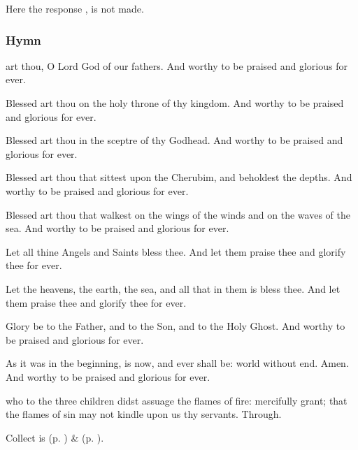 \begin{rubric}
    Here the response , is not made.
\end{rubric}

\subsubsection{Hymn}
 art thou, O Lord God of our fathers. And worthy to be praised and glorious for ever.\par
{}

Blessed art thou on the holy throne of thy kingdom. And worthy to be praised and glorious for ever.

Blessed art thou in the sceptre of thy Godhead. And worthy to be praised and glorious for ever.

Blessed art thou that sittest upon the Cherubim, and beholdest the depths. And worthy to be praised and glorious for ever.

Blessed art thou that walkest on the wings of the winds and on the waves of the sea. And worthy to be praised and glorious for ever.

Let all thine Angels and Saints bless thee. And let them praise thee and glorify thee for ever.

Let the heavens, the earth, the sea, and all that in them is bless thee. And let them praise thee and glorify thee for ever.

Glory be to the Father, and to the Son, and to the Holy Ghost. And worthy to be praised and glorious for ever.

As it was in the beginning, is now, and ever shall be: world without end. Amen. And worthy to be praised and glorious for ever.\\


{} who to the three children didst assuage the flames of fire: mercifully grant; that the flames of sin may not kindle upon us thy servants. Through.
\begin{rubric}
     Collect is  (p. \pageref{SPSaints}) \&   (p. \pageref{SPLivingDeparted}).
\end{rubric}

